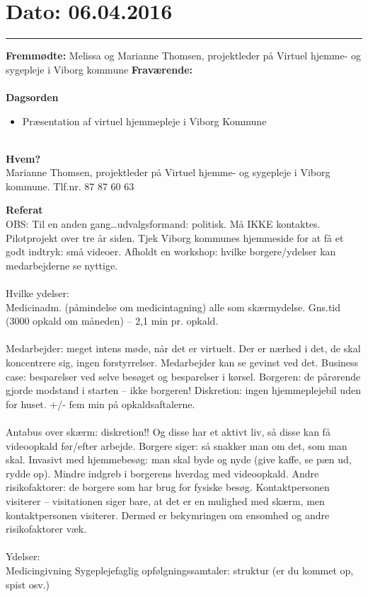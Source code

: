\section{Dato: 06.04.2016}
\hrule

\textbf{Fremmødte:} Melissa og Marianne Thomsen, projektleder på Virtuel hjemme- og sygepleje i Viborg kommune
\textbf{Fraværende:} 
\\
\\
\textbf{Dagsorden}
\begin{itemize}
	\item Præsentation af virtuel hjemmepleje i Viborg Kommune
\end{itemize}
 
\\
\textbf{Hvem?}
\\
Marianne Thomsen, projektleder på Virtuel hjemme- og sygepleje i Viborg kommune.
Tlf.nr. 87 87 60 63

\textbf{Referat}
\\
OBS: Til en anden gang…udvalgsformand: politisk. Må IKKE kontaktes. 
Pilotprojekt over tre år siden. 
Tjek Viborg kommunes hjemmeside for at få et godt indtryk: små videoer.
Afholdt en workshop: hvilke borgere/ydelser kan medarbejderne se nyttige.\\ \\
Hvilke ydelser:\\
Medicinadm. (påmindelse om medicintagning) alle som skærmydelse.
Gns.tid (3000 opkald om måneden) – 2,1 min pr. opkald. \\ \\
Medarbejder: meget intens møde, når det er virtuelt. Der er nærhed i det, de skal koncentrere sig, ingen forstyrrelser. Medarbejder kan se gevinst ved det.
Business case: besparelser ved selve besøget og besparelser i kørsel.
Borgeren: de pårørende gjorde modstand i starten – ikke borgeren! 
Diskretion: ingen hjemmeplejebil uden for huset.
+/- fem min på opkaldsaftalerne.
\\ \\
Antabus over skærm: diskretion!! Og disse har et aktivt liv, så disse kan få videoopkald før/efter arbejde. 
Borgere siger: så snakker man om det, som man skal. 
Invasivt med hjemmebesøg: man skal byde og nyde (give kaffe, se pæn ud, rydde op). 
Mindre indgreb i borgerens hverdag med videoopkald. 
Andre risikofaktorer: de borgere som har brug for fysiske besøg.
Kontaktpersonen visiterer – visitationen siger bare, at det er en mulighed med skærm, men kontaktpersonen visiterer. Dermed er bekymringen om ensomhed og andre risikofaktorer væk.
\\ \\Ydelser:\\
Medicingivning
Sygeplejefaglig opfølgningssamtaler: struktur (er du kommet op, spist osv.)  


